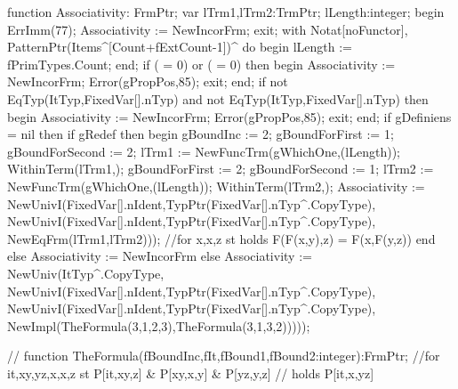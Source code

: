    function Associativity: FrmPtr;
   var lTrm1,lTrm2:TrmPtr;
   lLength:integer;
   begin
      ErrImm(77);
      Associativity := NewIncorFrm;
      exit;
      with Notat[noFunctor], PatternPtr(Items^[Count+fExtCount-1])^ do
      begin
         lLength := fPrimTypes.Count;
      end;
      if ( = 0) or ( = 0) then
      begin
         Associativity := NewIncorFrm;
         Error(gPropPos,85);
         exit;
      end;
      if not EqTyp(ItTyp,FixedVar[].nTyp) and
            not EqTyp(ItTyp,FixedVar[].nTyp)  then
      begin
         Associativity := NewIncorFrm;
         Error(gPropPos,85);
         exit;
      end;
      if gDefiniens = nil then
         if gRedef then
         begin gBoundInc := 2;
         gBoundForFirst := 1; gBoundForSecond := 2;
         lTrm1 := NewFuncTrm(gWhichOne,(lLength));
         WithinTerm(lTrm1,);
         gBoundForFirst := 2; gBoundForSecond := 1;
         lTrm2 := NewFuncTrm(gWhichOne,(lLength));
         WithinTerm(lTrm2,);
         Associativity := 
            NewUnivI(FixedVar[].nIdent,TypPtr(FixedVar[].nTyp^.CopyType),
                     NewUnivI(FixedVar[].nIdent,TypPtr(FixedVar[].nTyp^.CopyType),
                              NewEqFrm(lTrm1,lTrm2)));
         //for x,x,z st holds F(F(x,y),z) = F(x,F(y,z))
         end
         else Associativity := NewIncorFrm
         else
            Associativity := 
               NewUniv(ItTyp^.CopyType,
                       NewUnivI(FixedVar[].nIdent,TypPtr(FixedVar[].nTyp^.CopyType),
                                NewUnivI(FixedVar[].nIdent,TypPtr(FixedVar[].nTyp^.CopyType),
                                         NewImpl(TheFormula(3,1,2,3),TheFormula(3,1,3,2)))));
      
      // function TheFormula(fBoundInc,fIt,fBound1,fBound2:integer):FrmPtr;
      //for it,xy,yz,x,x,z st P[it,xy,z] & P[xy,x,y] & P[yz,y,z]
      //  holds P[it,x,yz]
      
